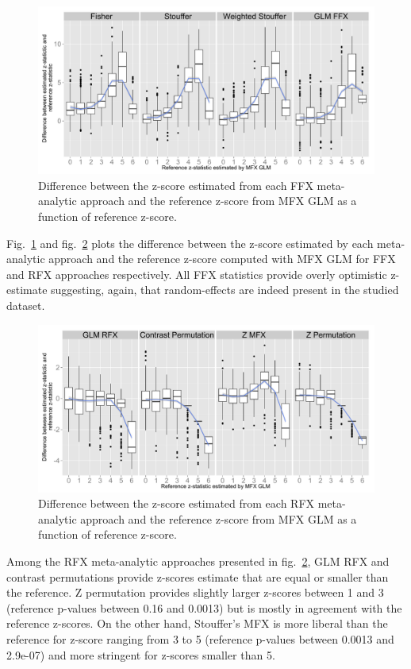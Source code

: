\documentclass{llncs}
\begin{document}
\begin{figure}[ht]
	\centering
	\includegraphics[width=\linewidth]{./Rplot_realdata_ffx.pdf}
	\caption{Difference between the z-score estimated from each FFX meta-analytic approach and the reference z-score from MFX GLM as a function of reference z-score.}
	\label{fig_realdata_ffx}
\end{figure}


Fig.~\ref{fig_realdata_ffx} and fig.~\ref{fig_realdata_rfx} plots the difference between the z-score estimated by each meta-analytic approach and the reference z-score computed with MFX GLM for FFX and RFX approaches respectively. All FFX statistics provide overly optimistic z-estimate suggesting, again, that random-effects are indeed present in the studied dataset.


\begin{figure}[ht]
	\centering
	\includegraphics[width=\linewidth]{./Rplot_realdata_rfx.pdf}
	\caption{Difference between the z-score estimated from each RFX meta-analytic approach and the reference z-score from MFX GLM as a function of reference z-score.}
	\label{fig_realdata_rfx}
\end{figure}


Among the RFX meta-analytic approaches presented in fig.~\ref{fig_realdata_rfx}, GLM RFX and contrast permutations provide z-scores estimate that are equal or smaller than the reference. Z permutation provides slightly larger z-scores between 1 and 3 (reference p-values between 0.16 and 0.0013) but is mostly in agreement with the reference z-scores. On the other hand, Stouffer's MFX is more liberal than the reference for z-score ranging from 3 to 5 (reference p-values between 0.0013 and 2.9e-07) and more stringent for z-scores smaller than 5.
\end{document}
